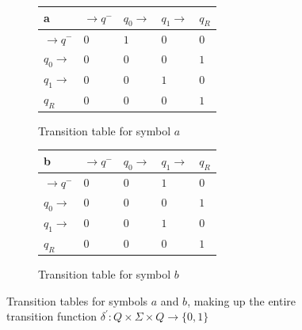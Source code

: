 \documentclass{article}
\begin{document}
%
%
\begin{figure}[H]
\begin{center}

	\setlength{\tabcolsep}{4pt}
	\renewcommand{\arraystretch}{1.4}
	
	\begin{subfigure}{.5\textwidth}

	\centering
	\begin{tabular}{|P{1.0cm} || P{0.8cm} | P{0.8cm} | P{0.8cm} | P{0.8cm}|}

	\hline
	a & $\rightarrow q^-$ & $q_0 \rightarrow$ & $q_1 \rightarrow$ & $q_R$ \\
	\hline
	\hline
	$\rightarrow q^-$ 		& $0$ & $1$ & $0$ & $0$ \\
	\hline
	$q_0 \rightarrow$ 		& $0$ & $0$ & $0$ & $1$ \\
	\hline
	$q_1 \rightarrow$ 		& $0$ & $0$ & $1$ & $0$ \\
	\hline
	$q_R$  					& $0$ & $0$ & $0$ & $1$ \\
	\hline

	\end{tabular}

	\caption{Transition table for symbol $a$}
	\label{fig:ttable_bin_a}	
	
	\end{subfigure}%
	\begin{subfigure}{.5\textwidth}
	
	\centering
	\begin{tabular}{|P{1.0cm} || P{0.8cm} | P{0.8cm} | P{0.8cm} | P{0.8cm}|}
	
	\hline
	b & $\rightarrow q^-$ & $q_0 \rightarrow$ & $q_1 \rightarrow$ & $q_R$ \\
	\hline
	\hline
	$\rightarrow q^-$ 		& $0$ & $0$ & $1$ & $0$ \\
	\hline
	$q_0 \rightarrow$ 		& $0$ & $0$ & $0$ & $1$ \\
	\hline
	$q_1 \rightarrow$ 		& $0$ & $0$ & $1$ & $0$ \\
	\hline
	$q_R$  					& $0$ & $0$ & $0$ & $1$ \\
	\hline

	\end{tabular}
	
	\caption{Transition table for symbol $b$}
	\label{fig:ttable_bin_b}
	
	\end{subfigure}%

	
\caption{Transition tables for symbols $a$ and $b$, making up the entire transition function $\delta^{'}: Q \times \Sigma \times Q \rightarrow \{0,1\}$}

\label{fig:ttable_bin}
\end{center}
\end{figure}
\end{document}
